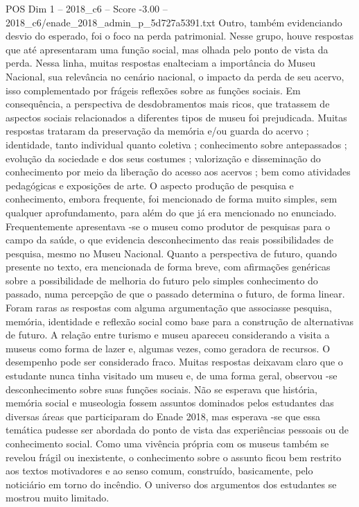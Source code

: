 \begin{textsample}{POS Dim 1 – 2018\_c6 – Score -3.00 – 2018\_c6/enade\_2018\_admin\_p\_5d727a5391.txt}
Outro, também evidenciando desvio do esperado, foi o foco na perda patrimonial.
Nesse grupo, houve respostas que até apresentaram uma função social, mas olhada pelo ponto de vista da perda.
Nessa linha, muitas respostas enalteciam a importância do Museu Nacional, sua relevância no cenário nacional, o impacto da perda de seu acervo, isso complementado por frágeis reflexões sobre as funções sociais.
Em consequência, a perspectiva de desdobramentos mais ricos, que tratassem de aspectos sociais relacionados a diferentes tipos de museu foi prejudicada.
Muitas respostas trataram da preservação da memória e/ou guarda do acervo ; identidade, tanto individual quanto coletiva ; conhecimento sobre antepassados ; evolução da sociedade e dos seus costumes ; valorização e disseminação do conhecimento por meio da liberação do acesso aos acervos ; bem como atividades pedagógicas e exposições de arte.
O aspecto produção de pesquisa e conhecimento, embora frequente, foi mencionado de forma muito simples, sem qualquer aprofundamento, para além do que já era mencionado no enunciado.
Frequentemente apresentava -se o museu como produtor de pesquisas para o campo da saúde, o que evidencia desconhecimento das reais possibilidades de pesquisa, mesmo no Museu Nacional.
Quanto a perspectiva de futuro, quando presente no texto, era mencionada de forma breve, com afirmações genéricas sobre a possibilidade de melhoria do futuro pelo simples conhecimento do passado, numa percepção de que o passado determina o futuro, de forma linear.
Foram raras as respostas com alguma argumentação que associasse pesquisa, memória, identidade e reflexão social como base para a construção de alternativas de futuro.
A relação entre turismo e museu apareceu considerando a visita a museus como forma de lazer e, algumas vezes, como geradora de recursos.
O desempenho pode ser considerado fraco.
Muitas respostas deixavam claro que o estudante nunca tinha visitado um museu e, de uma forma geral, observou -se desconhecimento sobre suas funções sociais.
Não se esperava que história, memória social e museologia fossem assuntos dominados pelos estudantes das diversas áreas que participaram do Enade 2018, mas esperava -se que essa temática pudesse ser abordada do ponto de vista das experiências pessoais ou de conhecimento social.
Como uma vivência própria com os museus também se revelou frágil ou inexistente, o conhecimento sobre o assunto ficou bem restrito aos textos motivadores e ao senso comum, construído, basicamente, pelo noticiário em torno do incêndio.
O universo dos argumentos dos estudantes se mostrou muito limitado.

\end{textsample}
